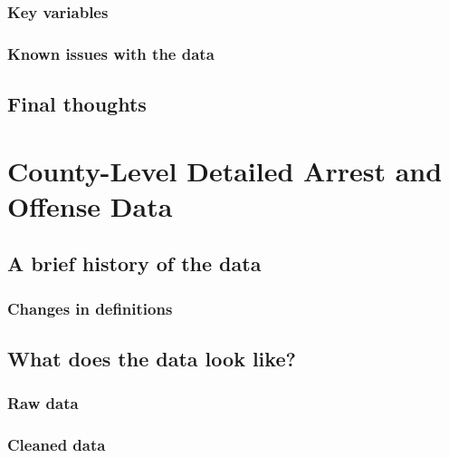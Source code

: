 \documentclass[
  12pt,
  openany]{book}
\begin{document}
\hypertarget{key-variables-4}{%
\subsection{Key variables}\label{key-variables-4}}

\hypertarget{known-issues-with-the-data-4}{%
\subsection{Known issues with the data}\label{known-issues-with-the-data-4}}

\hypertarget{final-thoughts-4}{%
\section{Final thoughts}\label{final-thoughts-4}}

\hypertarget{county_level}{%
\chapter{County-Level Detailed Arrest and Offense Data}\label{county_level}}

\hypertarget{a-brief-history-of-the-data-5}{%
\section{A brief history of the data}\label{a-brief-history-of-the-data-5}}

\hypertarget{changes-in-definitions-5}{%
\subsection{Changes in definitions}\label{changes-in-definitions-5}}

\hypertarget{what-does-the-data-look-like-5}{%
\section{What does the data look like?}\label{what-does-the-data-look-like-5}}

\hypertarget{raw-data-5}{%
\subsection{Raw data}\label{raw-data-5}}

\hypertarget{cleaned-data-5}{%
\subsection{Cleaned data}\label{cleaned-data-5}}
\end{document}
